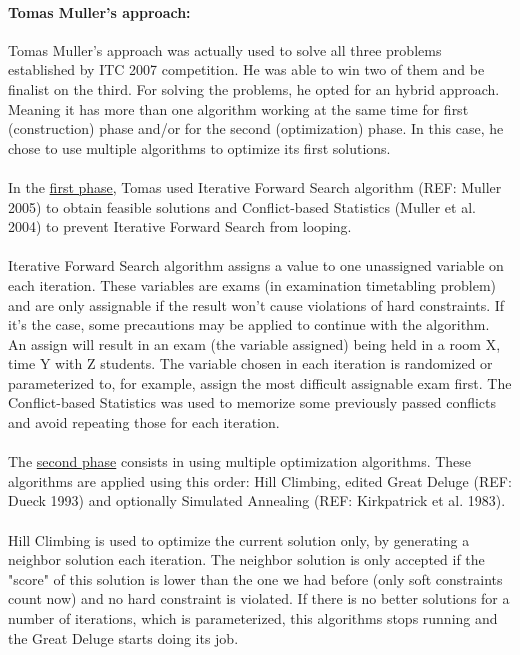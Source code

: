 \paragraph{\textbf{Tomas Muller's approach:}}

Tomas Muller's approach was actually used to solve all three problems established by ITC 2007 competition. He was able to win two of them and be finalist on the third. For solving the problems, he opted for an hybrid approach. Meaning it has more than one algorithm working at the same time for first (construction) phase and/or for the second (optimization) phase. In this case, he chose to use multiple algorithms to optimize its first solutions.\\
\\
In the \underline{first phase}, Tomas used Iterative Forward Search algorithm (REF: Muller 2005) to obtain feasible solutions and Conflict-based Statistics (Muller et al. 2004) to prevent Iterative Forward Search from looping. \\
\\
Iterative Forward Search algorithm assigns a value to one unassigned variable on each iteration. These variables are exams (in examination timetabling problem) and are only assignable if the result won't cause violations of hard constraints. If it's the case, some precautions may be applied to continue with the algorithm. An assign will result in an exam (the variable assigned) being held in a room X, time Y with Z students. The variable chosen in each iteration is randomized or parameterized to, for example, assign the most difficult assignable exam first. The Conflict-based Statistics was used to memorize some previously passed conflicts and avoid repeating those for each iteration.\\
\\
The \underline{second phase} consists in using multiple optimization algorithms. These algorithms are applied using this order: Hill Climbing, edited Great Deluge (REF: Dueck 1993) and optionally Simulated Annealing (REF: Kirkpatrick et al. 1983).\\
\\
Hill Climbing is used to optimize the current solution only, by generating a neighbor solution each iteration. The neighbor solution is only accepted if the "score" of this solution is lower than the one we had before (only soft constraints count now) and no hard constraint is violated. If there is no better solutions for a number of iterations, which is parameterized, this algorithms stops running and the Great Deluge starts doing its job.\\
